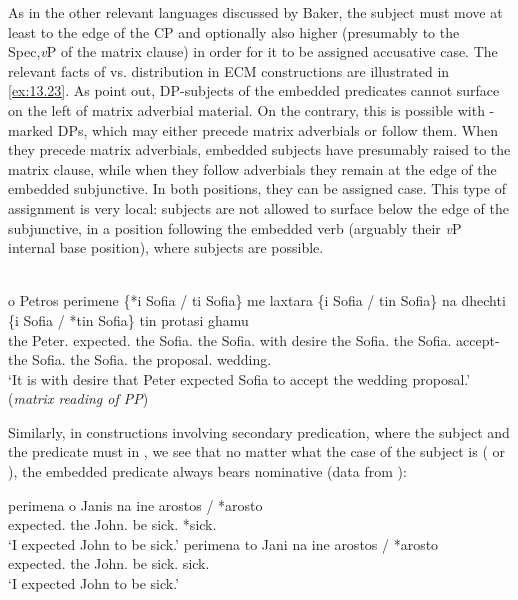 \documentclass[output=paper]{langsci/langscibook}
\begin{document}
As in the other relevant languages discussed by Baker, the subject must move at
least to the edge of the CP and optionally also higher (presumably to the
Spec,\emph{v}P of the matrix clause) in order for it to be assigned accusative
case.  The relevant facts of \Acc{} vs. \Nom{} distribution in  ECM
constructions are illustrated in \eqref{ex:13.23}. As \citet{KotzPapa2007} point
out, \Nom{} DP-subjects of the embedded predicates cannot surface on the left of
matrix adverbial material. On the contrary, this is possible with \Acc{}-marked
DPs, which may either precede matrix adverbials or follow them. When they
precede matrix adverbials, embedded \Acc{} subjects have presumably raised to the
matrix clause, while when they follow adverbials they remain at the edge of the
embedded subjunctive. In both positions, they can be assigned \Acc{} case. This
type of \Acc{} assignment is very local: \Acc{} subjects are not allowed to
surface below the edge of the subjunctive, in a position following the embedded
verb (arguably their \emph{v}P internal base position), where \Nom{} subjects are
possible.

\ea%
\label{ex:13.23}\\
    \gll o Petros perimene \{*i Sofia / ti Sofia\} me laxtara \{i Sofia / tin Sofia\} na dhechti \{i Sofia / *tin Sofia\} tin protasi ghamu \\
    the Peter.\Nom{} expected.\Tsg{} \hphantom{\{*}the Sofia.\textbf{\Nom{}} {}
        the Sofia.\textbf{\Acc{}} with desire \hphantom{\{}the
            Sofia.\textbf{\Nom} {} the Sofia.\textbf{\Acc} \Sbjv{} accept-\Tsg{}
            \hphantom{\{}the Sofia.\textbf{\Nom} {} \hphantom{*}the
                Sofia.\textbf{\Acc} the proposal.\Acc{} wedding.\Gen{}\\
    \glt    \enquote*{It is with desire that Peter expected Sofia to accept the wedding proposal.} (\emph{matrix reading of PP})
\z

Similarly, in constructions involving secondary predication, where the subject
and the predicate must  in , we see that no matter what
the case of the subject is (\Nom{} or \Acc), the embedded predicate always
bears nominative (data from \citealt{KotzPapa2007}):

\ea%
\label{ex:13.24} \parencite{KotzPapa2007}
	\ea
	\gll  perimena o Janis na ine arostos / *arosto\\
        expected.\Fsg{} the John.\Nom{} \Sbjv{} be sick.\Nom{} {} \hphantom{*}*sick.\Acc{}\\
	\glt     ‘I expected John to be sick.’
	\ex
	\gll  perimena to Jani na ine arostos / *arosto\\
        expected.\Fsg{} the John.\Acc{} \Sbjv{} be sick.\Nom{} {} \hphantom{*}sick.\Acc{}\\
	\glt     ‘I expected John to be sick.’
    \z
\z
\end{document}

